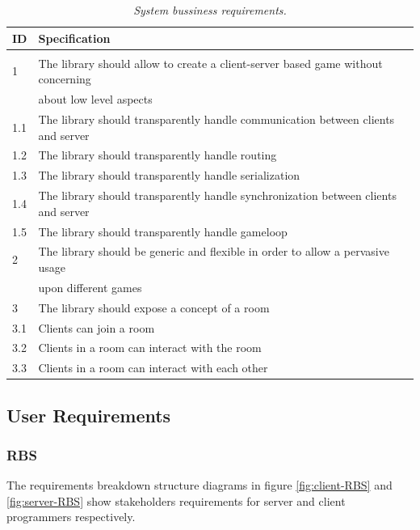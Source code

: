 \begin{center}
  \begin{longtable}{|l|l|} 
  \caption{\textit{System bussiness requirements.}} \label{table:buss-req} \\
   
\hline
ID   &  Specification \\
\hline
\multicolumn{2}{|c|}{} \\
\hline
1   & The library should allow to create a client-server based game without concerning \\ 
    & about low level aspects \\
1.1 & The library should transparently handle communication between clients and server \\
1.2 & The library should transparently handle routing \\
1.3 & The library should transparently handle serialization \\
1.4 & The library should transparently handle synchronization between clients and server \\
1.5 & The library should transparently handle gameloop \\
2   & The library should be generic and flexible in order to allow a pervasive usage \\
    & upon different games \\    
3   & The library should expose a concept of a room \\
3.1 & Clients can join a room \\
3.2 & Clients in a room can interact with the room \\
3.3 & Clients in a room can interact with each other \\
\hline

  \end{longtable}
\end{center}

\subsection{User Requirements}

\subsubsection{RBS}

The requirements breakdown structure diagrams in figure \ref{fig:client-RBS} and \ref{fig:server-RBS} show stakeholders requirements for server and client programmers respectively.  

